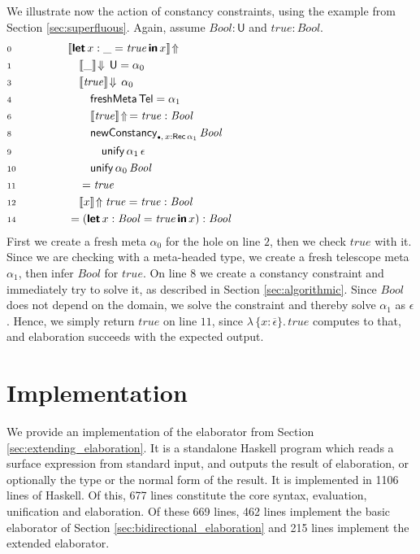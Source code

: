 \documentclass[acmsmall,review,anonymous,prologue,dvipsnames]{acmart}\settopmatter{printfolios=true,printccs=false,printacmref=false}
\newcommand{\slet}{\boldsymbol{\mathsf{let}}}
\renewcommand{\sin}{\boldsymbol{\mathsf{in}}}
\renewcommand{\U}{\mathsf{U}}
\newcommand{\emptycon}{\scaleobj{.75}\bullet}
\newcommand{\unify}{\mathsf{unify}}
\newcommand{\mi}[1]{\mathit{#1}}
\newcommand{\echeckt}[2]{\llbracket#1\rrbracket\!\Downarrow\,#2}
\newcommand{\einfert}[1]{\llbracket#1\rrbracket\!\Uparrow}
\newcommand{\Tel}{\mathsf{Tel}}
\newcommand{\Rec}{\mathsf{Rec}}
\newcommand{\ol}[1]{\overline{#1}}
\theoremstyle{remark}
\begin{document}
\begin{example}
We illustrate now the action of constancy constraints, using the example from
Section \ref{sec:superfluous}. Again, assume $\mi{Bool} : \U$ and $\mi{true} : \mi{Bool}$.
\begin{alignat*}{3}
& \scriptstyle{0}\qquad\qquad && \einfert{\slet\,x : \_ = \mi{true}\,\sin\,x}
      \hspace{21em}\\
& \scriptstyle{1} && \quad \echeckt{\_}{\U} = \alpha_0\\
& \scriptstyle{3} && \quad \echeckt{\mi{true}}{\alpha_0}\\
& \scriptstyle{4} && \qquad \mathsf{freshMeta}\,\Tel = \alpha_1\\
& \scriptstyle{6} && \qquad \einfert{\mi{true}}\,= \mi{true} : \mi{Bool}\\
& \scriptstyle{8} && \qquad \mathsf{newConstancy}_{\emptycon,\,x : \Rec\,\alpha_1}\,\mi{Bool}\\
& \scriptstyle{9} && \qquad\quad \unify\,\alpha_1\,\epsilon\\
& \scriptstyle{10} && \qquad \unify\,\alpha_0\,\mi{Bool}\\
& \scriptstyle{11} && \quad = \mi{true}\\
& \scriptstyle{12} && \quad \einfert{x}{\mi{true}} = \mi{true} : \mi{Bool}\\
& \scriptstyle{14} && = (\slet\,x : \mi{Bool} = \mi{true}\,\sin\,x) : \mi{Bool}
\end{alignat*}
First we create a fresh meta $\alpha_0$ for the hole on line $\scriptstyle{2}$,
then we check $\mi{true}$ with it. Since we are checking with a meta-headed type, we
create a fresh telescope meta $\alpha_1$, then infer $\mi{Bool}$ for
$\mi{true}$. On line $\scriptstyle{8}$ we create a constancy constraint and
immediately try to solve it, as described in Section
\ref{sec:algorithmic}. Since $\mi{Bool}$ does not depend on the domain, we solve
the constraint and thereby solve $\alpha_1$ as $\epsilon$. Hence, we simply
return $\mi{true}$ on line $\scriptstyle{11}$, since $\lambda\,\{x :
\ol{\epsilon}\}.\,\mi{true}$ computes to that, and elaboration succeeds with the
expected output.
\end{example}

\section{Implementation}
\label{sec:impl_and_eval}

We provide an implementation of the elaborator from Section
\ref{sec:extending_elaboration}. It is a standalone Haskell program which reads
a surface expression from standard input, and outputs the result of elaboration,
or optionally the type or the normal form of the result. It is implemented in
1106 lines of Haskell. Of this, 677 lines constitute the core syntax,
evaluation, unification and elaboration. Of these 669 lines, 462 lines implement
the basic elaborator of Section \ref{sec:bidirectional_elaboration} and 215
lines implement the extended elaborator.
\end{document}
